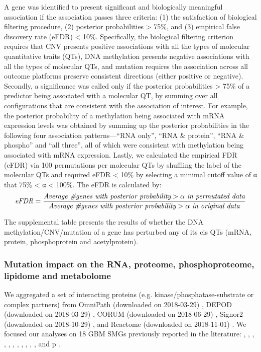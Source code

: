 A gene was identified to present significant and biologically meaningful association if the association passes three criteria: (1) the satisfaction of biological filtering procedure, (2) posterior probabilities > 75\%, and (3) empirical false discovery rate (eFDR) < 10\%. Specifically, the biological filtering criterion requires that CNV presents positive associations with all the types of molecular quantitative traits (QTs), DNA methylation presents negative associations with all the types of molecular QTs, and mutation requires the association across all outcome platforms preserve consistent directions (either positive or negative). Secondly, a significance was called only if the posterior probabilities > 75\% of a predictor being associated with a molecular QT, by summing over all configurations that are consistent with the association of interest. For example, the posterior probability of a methylation being associated with mRNA expression levels was obtained by summing up the posterior probabilities in the following four association patterns---``RNA only'', ``RNA \& protein'', ``RNA \& phospho'' and ``all three'', all of which were consistent with methylation being associated with mRNA expression. Lastly, we calculated the empirical FDR (eFDR) via 100 permutations per molecular QTs by shuffling the label of the molecular QTs and required eFDR < 10\% by selecting a minimal cutoff value of α that 75\% < α < 100\%. The eFDR is calculated by:
\[
    \mathit{eFDR} = \frac
        {\text{\itshape Average \#genes with posterior probability} > \alpha\ \text{\itshape in permutated data}}
        {\text{\itshape Average \#genes with posterior probability} > \alpha\ \text{\itshape in original data}}
\]

The supplemental table presents the results of whether the DNA methylation/CNV/mutation of a gene has perturbed any of its cis QTs (mRNA, protein, phosphoprotein and acetylprotein).

\subsubsection{Mutation impact on the RNA, proteome, phosphoproteome, lipidome and metabolome}
We aggregated a set of interacting proteins (e.g. kinase/phosphatase-substrate or complex partners) from OmniPath (downloaded on 2018-03-29) \cite{tureid_saez-rodriguezj:OmniPathGuidelines2016}, DEPOD (downloaded on 2018-03-29) \cite{duang_kohnm:HumanDEPhOsphorylation2015}, CORUM (downloaded on 2018-06-29) \cite{rueppa_meweshw:CORUMComprehensive2010}, Signor2 (downloaded on 2018-10-29) \cite{perfettol_cesarenig:SIGNORDatabase2016}, and Reactome (downloaded on 2018-11-01) \cite{fabregata_deustachiop:ReactomePathway2018}. We focused our analyses on 18 GBM SMGs previously reported in the literature: , , , , , , , , , , , and p \cite{baileymh_dingl:ComprehensiveCharacterization2018,brennancw_chinl:GBM2013}.

